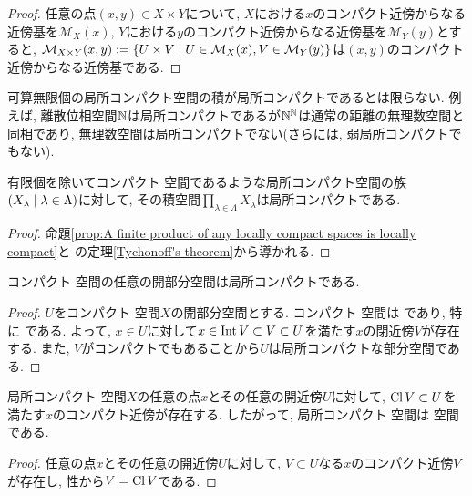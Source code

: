 \documentclass[uplatex, dvipdfmx, a4paper, 12pt, class=jsbook, crop=false]{standalone}
\begin{document}
\begin{proof}
	任意の点$ (x, y) \in X \times Y $について, $ X $における$ x $のコンパクト近傍からなる近傍基を$ \mathcal{M}_X(x) $, $ Y $における$ y $のコンパクト近傍からなる近傍基を$ \mathcal{M}_Y(y) $とすると, $ \mathcal{M}_{X \times Y}(x, y) \defeq \setcomp{U \times V}{U \in \mathcal{M}_X(x), V \in \mathcal{M}_Y(y)} $は$ (x, y) $のコンパクト近傍からなる近傍基である.
\end{proof}

可算無限個の局所コンパクト空間の積が局所コンパクトであるとは限らない. 例えば, 離散位相空間$ \mathbb{N} $は局所コンパクトであるが$ \mathbb{N}^{\mathbb{N}} $は通常の距離の無理数空間と同相であり, 無理数空間は局所コンパクトでない(さらには, 弱局所コンパクトでもない).

\begin{corollary}
	有限個を除いてコンパクト \Hausdorff 空間であるような局所コンパクト空間の族$ \setfamily{X_\lambda}{\lambda \in \Lambda} $に対して, その積空間$ \prod_{\lambda \in \Lambda} X_\lambda $は局所コンパクトである.
\end{corollary}

\begin{proof}
	命題\ref{prop:A finite product of any locally compact spaces is locally compact}と \Tychonoff の定理\ref{Tychonoff's theorem}から導かれる.
\end{proof}

\begin{proposition}
	コンパクト \Hausdorff 空間の任意の開部分空間は局所コンパクトである.
\end{proposition}
\begin{proof}
	$ U $をコンパクト \Hausdorff 空間$ X $の開部分空間とする. コンパクト \Hausdorff 空間は  であり, 特に  である. よって, $ x \in U $に対して$ x \in \mathop{\mathrm{Int}}\nolimits V \subset V \subset U $を満たす$ x $の閉近傍$ V $が存在する. また, $ V $がコンパクトでもあることから$ U $は局所コンパクトな部分空間である.
\end{proof}

\begin{lemma}
	局所コンパクト \Hausdorff 空間$ X $の任意の点$ x $とその任意の開近傍$ U $に対して, $ \mathop{\mathrm{Cl}}\nolimits V \subset U $を満たす$ x $のコンパクト近傍が存在する. したがって, 局所コンパクト \Hausdorff 空間は  空間である.
\end{lemma}

\begin{proof}
	任意の点$ x $とその任意の開近傍$ U $に対して, $ V \subset U $なる$ x $のコンパクト近傍$ V $が存在し, \Hausdorff 性から$ V = \mathop{\mathrm{Cl}}\nolimits V $である.
\end{proof}
\end{document}
